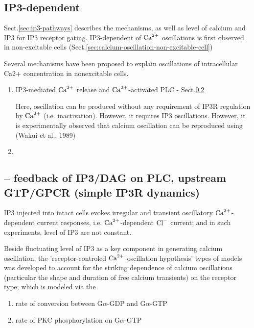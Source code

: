 \subsection{IP3-dependent}
\label{sec:IP3-calcium-oscillation}

Sect.\ref{sec:ip3-pathways} describes the mechanisms, as well as level of
calcium and IP3 for IP3 receptor gating. IP3-dependent of ${\text{Ca}^{2+}}$ oscillations is
first observed in non-excitable cells
(Sect.\ref{sec:calcium-oscillation-non-excitable-cell})

\label{sec:IP3-oscillation-mechanisms} Several mechanisms have been proposed to
explain oscillations of intracellular Ca2+ concentration in nonexcitable cells.

\begin{enumerate}
  \item IP3-mediated ${\text{Ca}^{2+}}$ release and ${\text{Ca}^{2+}}$-activated PLC - 
  Sect.\ref{sec:calcium-oscillation-Ca-activated-PLC}

Here, oscillation can be produced without any requirement of IP3R regulation by
${\text{Ca}^{2+}}$ (i.e. inactivation). However, it requires IP3 oscillations.
However, it is experimentally observed that calcium oscillation can be
reproduced using (Wakui et al., 1989)

  
  \item 
\end{enumerate}

\subsection{-- feedback of IP3/DAG on PLC, upstream GTP/GPCR (simple IP3R
dynamics)}
\label{sec:calcium-oscillation-Ca-activated-PLC}

IP3 injected into intact cells evokes irregular and transient oscillatory
${\text{Ca}^{2+}}$-dependent current responses, i.e. ${\text{Ca}^{2+}}$-dependent ${\text{Cl}^{-}}$ current; and in
such experiments, level of IP3 are not constant.

Beside fluctuating level of IP3 as a key component in generating calcium
oscillation, the 'receptor-controled ${\text{Ca}^{2+}}$ oscillation hypothesis' types of
models was developed to account for the striking dependence of calcium
oscillations (particular the shape and duration of free calcium transients) on
the receptor type; which is modeled via the
\begin{enumerate}
  \item rate of conversion between G$\alpha$-GDP and G$\alpha$-GTP
  \item rate of PKC phosphorylation on G$\alpha$-GTP
\end{enumerate}

